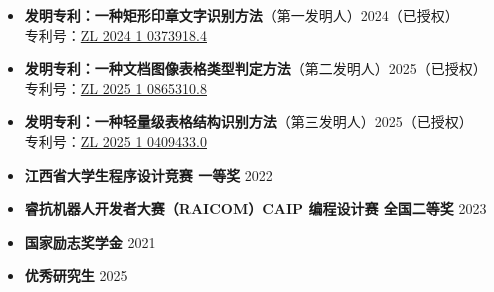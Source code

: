 \documentclass[zh]{resume}
\begin{document}
\begin{itemize}
  \item \textbf{发明专利：一种矩形印章文字识别方法}（第一发明人）\hfill 2024（已授权）\\
        专利号：\href{https://pss-system.cponline.cnipa.gov.cn/documents/detail?prevPageTit=changgui}{ZL 2024 1 0373918.4}

  \item \textbf{发明专利：一种文档图像表格类型判定方法}（第二发明人）\hfill 2025（已授权）\\
        专利号：\href{https://pss-system.cponline.cnipa.gov.cn/documents/detail?prevPageTit=changgui}{ZL 2025 1 0865310.8}

  \item \textbf{发明专利：一种轻量级表格结构识别方法}（第三发明人）\hfill 2025（已授权）\\
        专利号：\href{https://pss-system.cponline.cnipa.gov.cn/documents/detail?prevPageTit=changgui}{ZL 2025 1 0409433.0}
\end{itemize}

\begin{itemize}
  \item \textbf{江西省大学生程序设计竞赛 一等奖} \hfill 2022
  \item \textbf{睿抗机器人开发者大赛（RAICOM）CAIP 编程设计赛 全国二等奖} \hfill 2023
  \item \textbf{国家励志奖学金} \hfill 2021
  \item \textbf{优秀研究生} \hfill 2025
\end{itemize}
\end{document}
